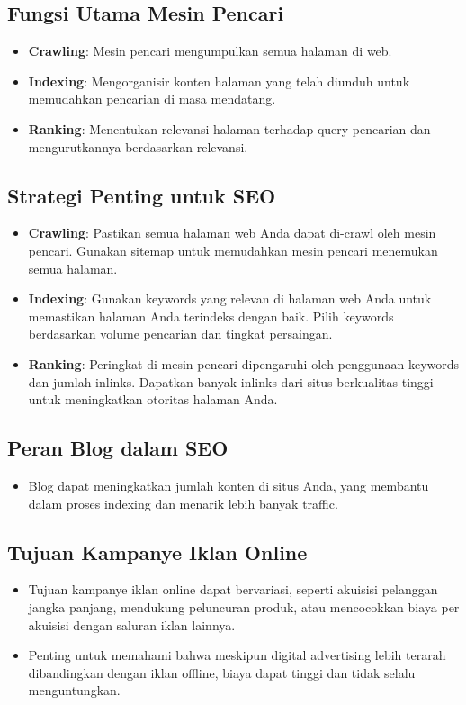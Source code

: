 \documentclass{article}
\begin{document}
\subsection{Fungsi Utama Mesin Pencari}
\begin{itemize}
    \item \textbf{Crawling}: Mesin pencari mengumpulkan semua halaman di web.
    \item \textbf{Indexing}: Mengorganisir konten halaman yang telah diunduh untuk memudahkan pencarian di masa mendatang.
    \item \textbf{Ranking}: Menentukan relevansi halaman terhadap query pencarian dan mengurutkannya berdasarkan relevansi.
\end{itemize}

\subsection{Strategi Penting untuk SEO}
\begin{itemize}
    \item \textbf{Crawling}: Pastikan semua halaman web Anda dapat di-crawl oleh mesin pencari. Gunakan sitemap untuk memudahkan mesin pencari menemukan semua halaman.
    \item \textbf{Indexing}: Gunakan keywords yang relevan di halaman web Anda untuk memastikan halaman Anda terindeks dengan baik. Pilih keywords berdasarkan volume pencarian dan tingkat persaingan.
    \item \textbf{Ranking}: Peringkat di mesin pencari dipengaruhi oleh penggunaan keywords dan jumlah inlinks. Dapatkan banyak inlinks dari situs berkualitas tinggi untuk meningkatkan otoritas halaman Anda.
\end{itemize}

\subsection{Peran Blog dalam SEO}
\begin{itemize}
    \item Blog dapat meningkatkan jumlah konten di situs Anda, yang membantu dalam proses indexing dan menarik lebih banyak traffic.
\end{itemize}

\subsection{Tujuan Kampanye Iklan Online}
\begin{itemize}
    \item Tujuan kampanye iklan online dapat bervariasi, seperti akuisisi pelanggan jangka panjang, mendukung peluncuran produk, atau mencocokkan biaya per akuisisi dengan saluran iklan lainnya.
    \item Penting untuk memahami bahwa meskipun digital advertising lebih terarah dibandingkan dengan iklan offline, biaya dapat tinggi dan tidak selalu menguntungkan.
\end{itemize}
\end{document}
